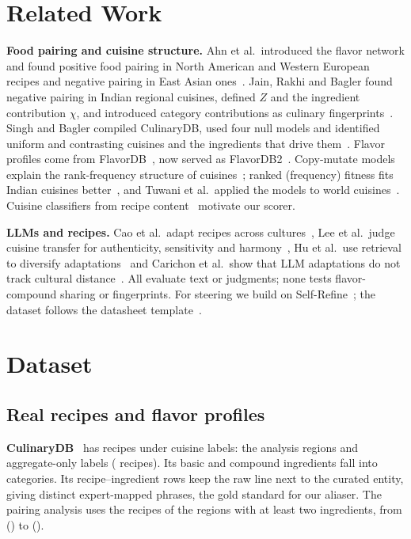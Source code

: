 \documentclass[conference]{IEEEtran}
\begin{document}
\section{Related Work}
\textbf{Food pairing and cuisine structure.} Ahn et al.\ introduced the flavor network and found positive food pairing in North American and Western European recipes and negative pairing in East Asian ones~\cite{ahn2011}. Jain, Rakhi and Bagler found negative pairing in Indian regional cuisines, defined $Z$ and the ingredient contribution $\chi$, and introduced category contributions as culinary fingerprints~\cite{jain2015}. Singh and Bagler compiled CulinaryDB, used four null models and identified uniform and contrasting cuisines and the ingredients that drive them~\cite{singh2018}. Flavor profiles come from FlavorDB~\cite{garg2018}, now served as FlavorDB2~\cite{goel2024flavordb2}. Copy-mutate models explain the rank-frequency structure of cuisines~\cite{kinouchi2008}; ranked (frequency) fitness fits Indian cuisines better~\cite{jain2018}, and Tuwani et al.\ applied the models to world cuisines~\cite{tuwani2019}. Cuisine classifiers from recipe content~\cite{sharma2020} motivate our scorer.

\textbf{LLMs and recipes.} Cao et al.\ adapt recipes across cultures~\cite{cao2024}, Lee et al.\ judge cuisine transfer for authenticity, sensitivity and harmony~\cite{lee2024ash}, Hu et al.\ use retrieval to diversify adaptations~\cite{hu2025carriage} and Carichon et al.\ show that LLM adaptations do not track cultural distance~\cite{carichon2026}. All evaluate text or judgments; none tests flavor-compound sharing or fingerprints. For steering we build on Self-Refine~\cite{madaan2023}; the dataset follows the datasheet template~\cite{gebru2021}.

\section{Dataset}
\subsection{Real recipes and flavor profiles}
\textbf{CulinaryDB}~\cite{singh2018} has \NCdbRecipes{} recipes under \NCdbLabels{} cuisine labels: the \NRegions{} analysis regions and \NCdbMiscLabels{} aggregate-only labels (\NCdbMiscRecipes{} recipes). Its \NCdbIngredients{} basic and \NCdbCompound{} compound ingredients fall into \NCdbCategories{} categories. Its \NCdbRows{} recipe--ingredient rows keep the raw line next to the curated entity, giving \NCdbPhrases{} distinct expert-mapped phrases, the gold standard for our aliaser. The pairing analysis uses the \NPairingRecipesTotal{} recipes of the \NRegions{} regions with at least two ingredients, from \NPairingMin{} (\NPairingMinRegion) to \NPairingMax{} (\NPairingMaxRegion).
\end{document}
